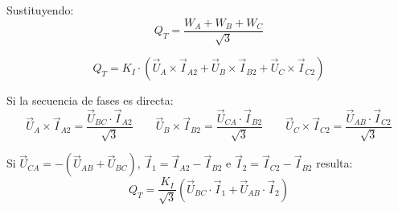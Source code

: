 				
				Sustituyendo:
				\[Q_T = \dfrac{W_A+W_B+W_C}{\sqrt{3}}\]
			
				\[Q_T = K_I\cdot (\vec U_A\times \vec I_{A2} +\vec U_B\times \vec I_{B2} + \vec U_C\times \vec I_{C2})\]
				
				
				Si la secuencia de fases es directa:
				\[\vec U_A\times \vec I_{A2} = \dfrac{\vec U_{BC}\cdot \vec I_{A2}}{\sqrt{3}}\qquad\vec U_B\times \vec I_{B2} = \dfrac{\vec U_{CA}\cdot \vec I_{B2}}{\sqrt{3}}\qquad\vec U_C\times \vec I_{C2} = \dfrac{\vec U_{AB}\cdot \vec I_{C2}}{\sqrt{3}}\]
				
				
				Si $\vec U_{CA} = -(\vec U_{AB} + \vec U_{BC})$, $\vec I_1 = \vec I_{A2} - \vec I_{B2}$ e $\vec I_2 = \vec I_{C2} - \vec I_{B2}$ resulta:
				\[Q_T = \dfrac{K_I}{\sqrt{3}}(\vec U_{BC}\cdot \vec I_1 + \vec U_{AB}\cdot \vec I_2)\]
				
